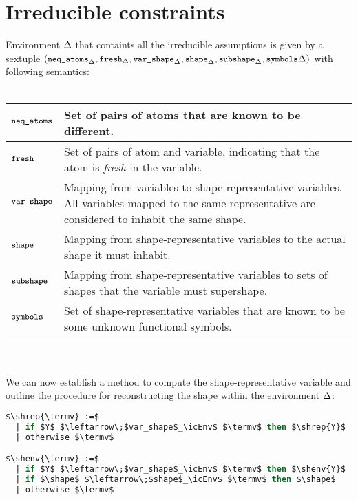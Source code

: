 \documentclass[english, mgr]{iithesis}
\renewcommand{\tt}[1]{\texttt{\small{#1}}}
\renewcommand{\it}[1]{\textit{#1}}
\begin{document}
\section{Irreducible constraints}
\label{sec:solverenv}
\newcommand{\NeqAtoms}{\tt{neq\_atoms}}
\newcommand{\Fresh}{\tt{fresh}}
\newcommand{\VarShape}{\tt{var\_shape}}
\newcommand{\Shape}{\tt{shape}}
\newcommand{\Subshape}{\tt{subshape}}
\newcommand{\Symbols}{\tt{symbols}}
\newcommand{\TransferShape}{\tt{transfer\_shape}}
\newcommand{\occurs}[2]{\ensuremath{ {#1}\text{ occurs in }{#2}}}
\newcommand{\stxoccurs}[2]{\ensuremath{ {#1}\text{ occurs syntactically in }{#2}}}
\newcommand{\pluseq}{\mathrel{+}=}
\newcommand{\minuseq}{\mathrel{-}=}
Environment $\Delta$ that containts all the irreducible assumptions is given by
a sextuple
$(\NeqAtoms_{\icEnv}
, \Fresh_{\icEnv}
, \VarShape_{\icEnv}
, \Shape_{\icEnv}
, \Subshape_{\icEnv}
, \Symbols{\icEnv}
)$ with following semantics:
\\ \\
\begin{tabularx}{\textwidth}{|l|X|}
\hline
$\NeqAtoms$ & Set of pairs of atoms that are known to be different. \\
\hline
$\Fresh$ & Set of pairs of atom and variable, indicating that the atom is \it{fresh} in the variable. \\
\hline
$\VarShape$ & Mapping from variables to shape-representative variables. All variables mapped to the same representative are considered to inhabit the same shape. \\
\hline
$\Shape$ & Mapping from shape-representative variables to the actual shape it must inhabit. \\
\hline
$\Subshape$ & Mapping from shape-representative variables to sets of shapes that the variable must supershape. \\
\hline
$\Symbols$ & Set of shape-representative variables that are known to be some unknown functional symbols. \\
\hline
\end{tabularx}
\\ \\
\newcommand{\shrep}[2][\icEnv]{\ensuremath{ #2_{#1}}}
\newcommand{\shenv}[2][\icEnv]{\ensuremath{ |#2|_{#1}}}
We can now establish a method to compute the shape-representative variable and
outline the procedure for reconstructing the shape within the environment $\Delta$:\\
\noindent
\begin{minipage}{0.5\textwidth}
\begin{lstlisting}[mathescape, language=OCaml]
$\shrep{\termv} :=$
  | if $Y$ $\leftarrow\;$var_shape$_\icEnv$ $\termv$ then $\shrep{Y}$
  | otherwise $\termv$

$\shenv{\termv} :=$
  | if $Y$ $\leftarrow\;$var_shape$_\icEnv$ $\termv$ then $\shenv{Y}$
  | if $\shape$ $\leftarrow\;$shape$_\icEnv$ $\termv$ then $\shape$
  | otherwise $\termv$

\end{lstlisting}
\end{minipage}
\end{document}
